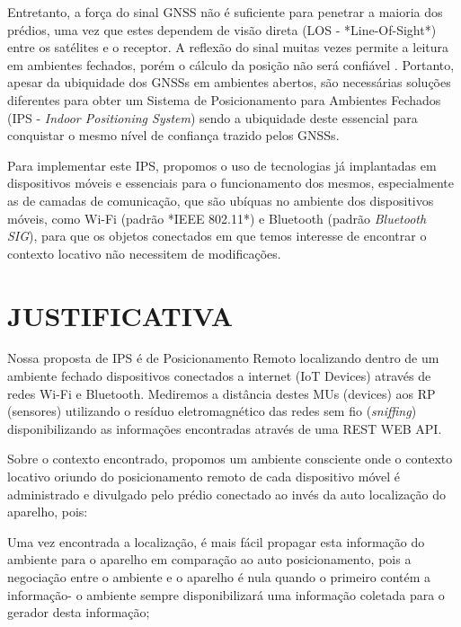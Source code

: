 \documentclass[
	12pt,				%
	openright,			%
	oneside,			%
	a4paper,			%
	chapter=TITLE,		%
	english,			%
	french,				%
	spanish,			%
	brazil				%
	]{abntex2}
\begin{document}
{Entretanto, a força do sinal GNSS não é suficiente para penetrar a maioria dos
prédios, uma vez que estes dependem de visão direta (LOS - *Line-Of-Sight*)
entre os satélites e o receptor. A reflexão do sinal muitas vezes permite a
leitura em ambientes fechados, porém o cálculo da posição não será confiável
\cite{Dartmouth2000}. Portanto, apesar da ubiquidade dos GNSSs em ambientes
abertos, são necessárias soluções diferentes para obter um Sistema de
Posicionamento para Ambientes Fechados (IPS - \textit{Indoor Positioning
System}) sendo a ubiquidade deste essencial para conquistar o mesmo nível de
confiança trazido pelos GNSSs.

Para implementar este IPS, propomos o uso de tecnologias já implantadas em
dispositivos móveis e essenciais para o funcionamento dos mesmos, especialmente
as de camadas de comunicação, que são ubíquas no ambiente dos dispositivos
móveis, como Wi-Fi (padrão *IEEE 802.11*) e Bluetooth (padrão \textit{Bluetooth
SIG}), para que os objetos conectados em que temos interesse de encontrar o
contexto locativo não necessitem de modificações.

\chapter{JUSTIFICATIVA}
\label{chap:JUSTIFICATIVA}

Nossa proposta de IPS é de Posicionamento Remoto localizando dentro de um
ambiente fechado dispositivos conectados a internet (IoT Devices) através de
redes Wi-Fi e Bluetooth. Mediremos a distância destes MUs (devices) aos RP
(sensores) utilizando o resíduo eletromagnético das redes sem fio
(\textit{sniffing}) disponibilizando as informações encontradas através de uma
REST WEB API.

Sobre o contexto encontrado, propomos um ambiente consciente onde o contexto
locativo oriundo do posicionamento remoto de cada dispositivo móvel é
administrado e divulgado pelo prédio conectado ao invés da auto localização do
aparelho, pois:

\begin{alineas}

	\item Uma vez encontrada a localização, é mais fácil propagar esta informação do
ambiente para o aparelho em comparação ao auto posicionamento, pois a negociação
entre o ambiente e o aparelho é nula quando o primeiro contém a informação- o
ambiente sempre disponibilizará uma informação coletada para o gerador desta
informação;


\end{alineas}}
\end{document}

